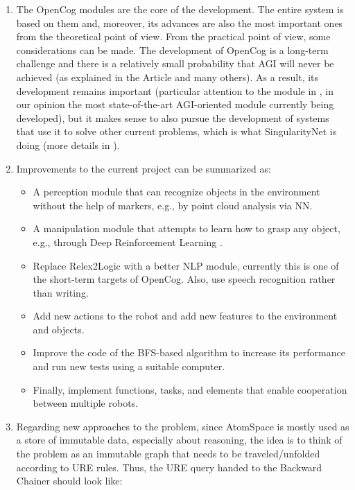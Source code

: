 \begin{enumerate}
	\item The OpenCog modules are the core of the development. The entire system is based on them and, moreover, its advances are also the most important ones from the theoretical point of view. From the practical point of view, some considerations can be made. The development of OpenCog is a long-term challenge and there is a relatively small probability that AGI will never be achieved (as explained in the Article \cite{hollander_2021} and many others). 
As a result, its development remains important (particular attention to the module in \cite{linas_learn}, in our opinion the most state-of-the-art AGI-oriented module currently being developed), but it makes sense to also pursue the development of systems that use it to solve other current problems, which is what SingularityNet is doing (more details in \cite{kolonin_2018}). 

	\item Improvements to the current project can be summarized as:

	\begin{itemize}
		\item A perception module that can recognize objects in the environment without the help of markers, e.g., by point cloud analysis via NN.

		\item A manipulation module that attempts to learn how to grasp any object, e.g., through Deep Reinforcement Learning \cite{DBLP:journals/corr/abs-2007-04499}.

		\item Replace Relex2Logic with a better NLP module, currently this is one of the short-term targets of OpenCog. Also, use speech recognition rather than writing.

		\item Add new actions to the robot and add new features to the environment and objects.

		\item Improve the code of the BFS-based algorithm to increase its performance and run new tests using a suitable computer.

		\item Finally, implement functions, tasks, and elements that enable cooperation between multiple robots.
	\end{itemize}

	\item Regarding new approaches to the problem, since AtomSpace is mostly used as a store of immutable data, especially about reasoning, the idea is to think of the problem as an immutable graph that needs to be traveled/unfolded according to URE rules. Thus, the URE query handed to the Backward Chainer should look like:


\end{enumerate}
